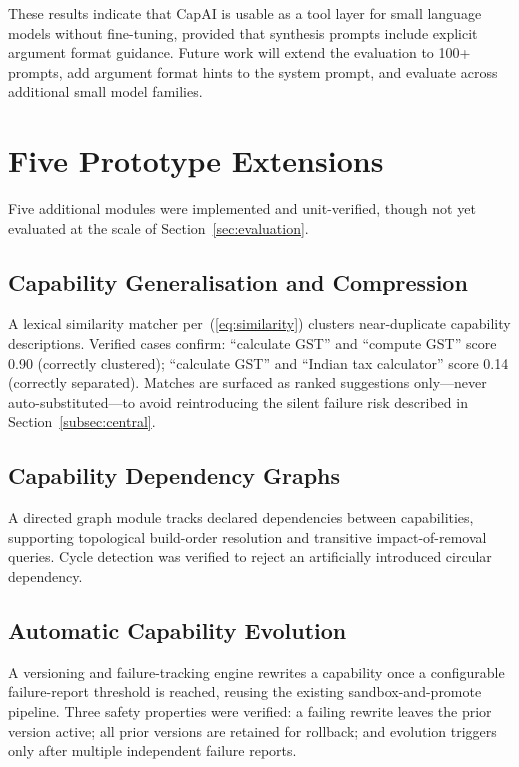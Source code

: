 \documentclass[conference]{IEEEtran}
\begin{document}
These results indicate that CapAI is usable as a tool layer for small
language models without fine-tuning, provided that synthesis prompts
include explicit argument format guidance.
Future work will extend the evaluation to 100+ prompts, add argument
format hints to the system prompt, and evaluate across additional small
model families.



\section{Five Prototype Extensions}
\label{sec:extensions}

Five additional modules were implemented and unit-verified, though not yet
evaluated at the scale of Section~\ref{sec:evaluation}.

\subsection{Capability Generalisation and Compression}

A lexical similarity matcher per~(\ref{eq:similarity}) clusters
near-duplicate capability descriptions.
Verified cases confirm: ``calculate GST'' and ``compute GST'' score 0.90
(correctly clustered); ``calculate GST'' and ``Indian tax calculator''
score 0.14 (correctly separated).
Matches are surfaced as ranked suggestions only---never
auto-substituted---to avoid reintroducing the silent failure risk
described in Section~\ref{subsec:central}.

\subsection{Capability Dependency Graphs}

A directed graph module tracks declared dependencies between capabilities,
supporting topological build-order resolution and transitive
impact-of-removal queries.
Cycle detection was verified to reject an artificially introduced circular
dependency.

\subsection{Automatic Capability Evolution}

A versioning and failure-tracking engine rewrites a capability once a
configurable failure-report threshold is reached, reusing the existing
sandbox-and-promote pipeline.
Three safety properties were verified: a failing rewrite leaves the prior
version active; all prior versions are retained for rollback; and evolution
triggers only after multiple independent failure reports.
\end{document}
